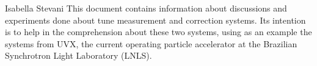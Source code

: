 \documentclass[a4paper, 12pt]{./Template/lnls-note}
\numberwithin{equation}{section} %
\newcommand*\blankpage{\newpage\null\thispagestyle{empty}\newpage}
\begin{document}
{Isabella Stevani}{\LNLS}
{This document contains information about discussions and experiments done about tune measurement and correction systems. Its intention is to help in the comprehension about these two systems, using as an example the systems from UVX, the current operating particle accelerator at the Brazilian Synchrotron Light Laboratory (LNLS).}

\blankpage
\newpage
\setcounter{page}{3}
\tableofcontents


\newpage

\end{document}
